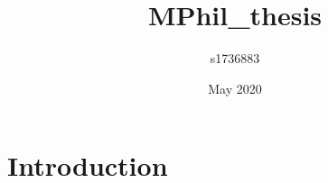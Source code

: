 \documentclass{infthesis}
\title{MPhil_thesis}
\author{s1736883 }
\date{May 2020}
\begin{document}
\maketitle

\section{Introduction}
\end{document}
